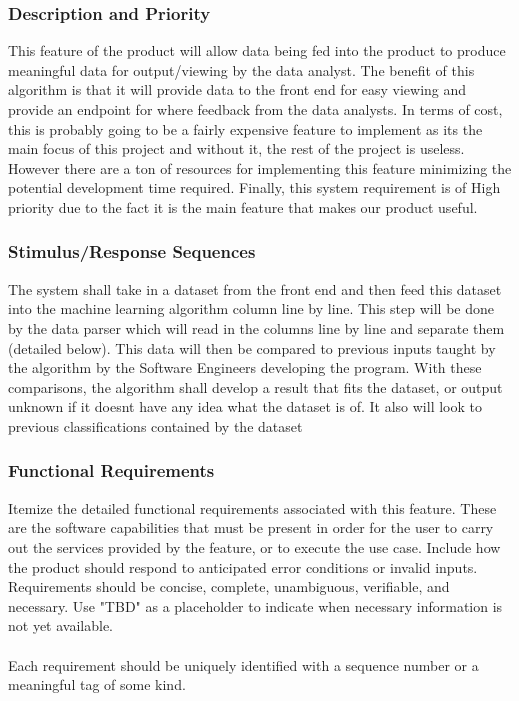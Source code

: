 \documentclass[12pt,oneside,letterpaper]{article}
\begin{document}
\subsubsection{Description and Priority}
This feature of the product will allow data being fed into the product to produce meaningful data for output/viewing by the data analyst. The benefit of this algorithm is that it will provide data to the \gls{front end} for easy viewing and provide an endpoint for where feedback from the data analysts. In terms of cost, this is probably going to be a fairly expensive feature to implement as its the main focus of this project and without it, the rest of the project is useless. However there are a ton of resources for implementing this feature minimizing the potential development time required. Finally, this system requirement is of High priority due to the fact it is the main feature that makes our product useful. 
\subsubsection{Stimulus/Response Sequences}
The system shall take in a dataset from the \gls{front end} and then feed this dataset into the machine learning algorithm column line by line. This step will be done by the data parser which will read in the columns line by line and separate them (detailed below). This data will then be compared to previous inputs taught by the algorithm by the Software Engineers developing the program. With these comparisons, the algorithm shall develop a result that fits the dataset, or output unknown if it doesnt have any idea what the dataset is of. It also will look to previous classifications contained by the dataset 
\subsubsection{Functional Requirements}
Itemize the detailed functional requirements associated with this feature. These are the software capabilities that must be present in order for the user to carry out the services provided by the feature, or to execute the use case. Include how the product should respond to anticipated error conditions or invalid inputs. Requirements should be concise, complete, unambiguous, verifiable, and necessary. Use "TBD" as a placeholder to indicate when necessary information is not yet available.\\
\\
Each requirement should be uniquely identified with a sequence number or a meaningful tag of some kind.
\end{document}
